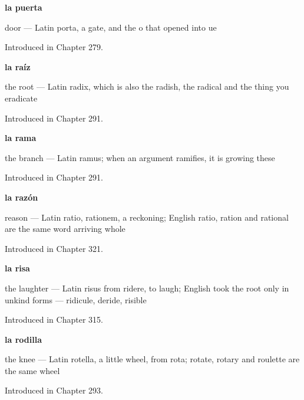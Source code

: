 \noindent\begin{minipage}[t]{\linewidth}
\raggedright
\textbf{la puerta}\par
\small door — Latin porta, a gate, and the o that opened into ue\par
\footnotesize Introduced in Chapter 279.
\end{minipage}\par\medskip

\noindent\begin{minipage}[t]{\linewidth}
\raggedright
\textbf{la raíz}\par
\small the root — Latin radix, which is also the radish, the radical and the thing you eradicate\par
\footnotesize Introduced in Chapter 291.
\end{minipage}\par\medskip

\noindent\begin{minipage}[t]{\linewidth}
\raggedright
\textbf{la rama}\par
\small the branch — Latin ramus; when an argument ramifies, it is growing these\par
\footnotesize Introduced in Chapter 291.
\end{minipage}\par\medskip

\noindent\begin{minipage}[t]{\linewidth}
\raggedright
\textbf{la razón}\par
\small reason — Latin ratio, rationem, a reckoning; English ratio, ration and rational are the same word arriving whole\par
\footnotesize Introduced in Chapter 321.
\end{minipage}\par\medskip

\noindent\begin{minipage}[t]{\linewidth}
\raggedright
\textbf{la risa}\par
\small the laughter — Latin risus from ridere, to laugh; English took the root only in unkind forms — ridicule, deride, risible\par
\footnotesize Introduced in Chapter 315.
\end{minipage}\par\medskip

\noindent\begin{minipage}[t]{\linewidth}
\raggedright
\textbf{la rodilla}\par
\small the knee — Latin rotella, a little wheel, from rota; rotate, rotary and roulette are the same wheel\par
\footnotesize Introduced in Chapter 293.
\end{minipage}\par\medskip

